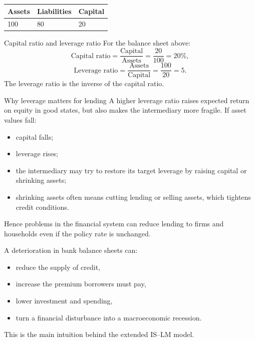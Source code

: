 \begin{center}
\renewcommand{\arraystretch}{1.25}
\begin{tabular}{|p{}|p{}|p{}|}
\hline
\textbf{Assets} & \textbf{Liabilities} & \textbf{Capital} \\
\hline
100 & 80 & 20 \\
\hline
\end{tabular}
\end{center}

\begin{definition}{Capital ratio and leverage ratio}{}
For the balance sheet above:
\[
\text{Capital ratio}=\frac{\text{Capital}}{\text{Assets}}=\frac{20}{100}=20\%,
\]
\[
\text{Leverage ratio}=\frac{\text{Assets}}{\text{Capital}}=\frac{100}{20}=5.
\]
The leverage ratio is the inverse of the capital ratio.
\end{definition}

\begin{theorem}{Why leverage matters for lending}{}
A higher leverage ratio raises expected return on equity in good states, but also makes the intermediary more fragile. If asset values fall:
\begin{itemize}[leftmargin=1.5em]
    \item capital falls;
    \item leverage rises;
    \item the intermediary may try to restore its target leverage by raising capital or shrinking assets;
    \item shrinking assets often means cutting lending or selling assets, which tightens credit conditions.
\end{itemize}
\end{theorem}

\noindent
Hence problems in the financial system can reduce lending to firms and households even if the policy rate is unchanged.

\begin{policynote}[title={Policy Application: Financial frictions as a macroeconomic channel}]
A deterioration in bank balance sheets can:
\begin{itemize}[leftmargin=1.5em]
    \item reduce the supply of credit,
    \item increase the premium borrowers must pay,
    \item lower investment and spending,
    \item turn a financial disturbance into a macroeconomic recession.
\end{itemize}
This is the main intuition behind the extended IS--LM model.
\end{policynote}

